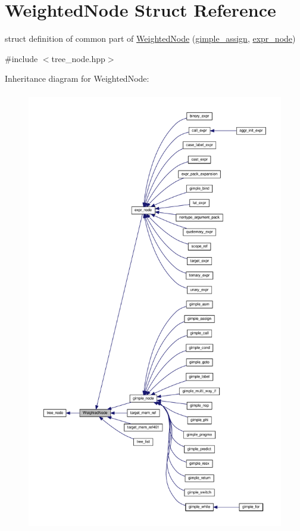 \hypertarget{structWeightedNode}{}\section{Weighted\+Node Struct Reference}
\label{structWeightedNode}


struct definition of common part of \hyperlink{structWeightedNode}{Weighted\+Node} (\hyperlink{structgimple__assign}{gimple\+\_\+assign}, \hyperlink{structexpr__node}{expr\+\_\+node})  




{\ttfamily \#include $<$tree\+\_\+node.\+hpp$>$}



Inheritance diagram for Weighted\+Node\+:
\nopagebreak
\begin{figure}[H]
\begin{center}
\leavevmode
\includegraphics[height=550pt]{d4/da5/structWeightedNode__inherit__graph}
\end{center}
\end{figure}



